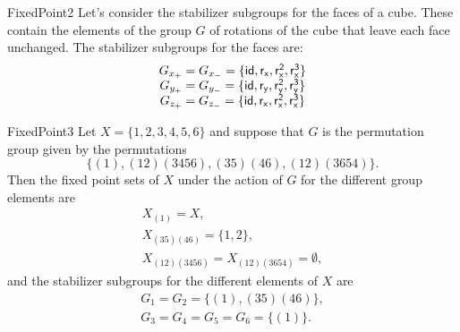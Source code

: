 \begin {example}{FixedPoint2}
Let's consider the stabilizer subgroups for the faces of a cube.  These contain the elements of the group $G$ of rotations of the cube that leave each face unchanged.  The stabilizer subgroups for the faces are:
$$\begin {array} {c}
G_{x_+}=G_{x_-}=\{\sf{id},r_x,r_x^2,r_x^3\}\\
G_{y_+}=G_{y_-}=\{\sf{id},r_y,r_y^2,r_y^3\}\\
G_{z_+}=G_{z_-}=\{\sf{id},r_x,r_x^2,r_x^3\}
\end {array}$$
\end{example}

\begin{example}{FixedPoint3}
Let $X = \{1, 2, 3, 4, 5, 6\}$ and suppose that $G$ is the permutation
group given by the permutations 
$$\{(1), (1 2)(3 4 5 6), (3 5)(4 6), (1 2)( 3 6 5 4)\}.$$
Then the fixed point sets of $X$ under the action of $G$ for the different group elements are
$$
\begin{array}{c}
X_{(1)} = X, \\
X_{(3 5)(4 6)} = \{1,2\}, \\
X_{(1 2)(3 4 5 6)} = X_{(1 2)(3 6 5 4)} = \emptyset,
\end{array}
$$
and the stabilizer subgroups for the different elements of $X$ are
$$
\begin{array}{c}
G_1 = G_2 = \{(1), (3 5)(4 6) \}, \\
G_3 = G_4 = G_5 = G_6 = \{(1)\}.
\end{array}
$$
\end{example}


